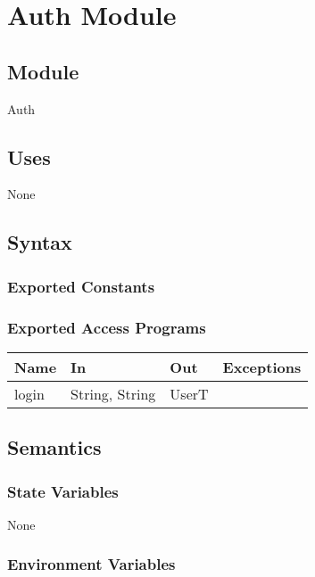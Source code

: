 \documentclass[12pt, titlepage]{article}
\begin{document}
\newpage

\section{Auth Module} \label{Auth} 

\subsection{Module}

Auth

\subsection{Uses}

None

\subsection{Syntax}

\subsubsection{Exported Constants}

\subsubsection{Exported Access Programs}

\begin{center}
\begin{tabular}{| p{4cm} | p{4cm} | p{4cm} | p{3cm} |}
\hline
\textbf{Name} & \textbf{In} & \textbf{Out} & \textbf{Exceptions} \\
\hline
login & String, String &  UserT &  \\
\hline
\end{tabular}
\end{center}

\subsection{Semantics}

\subsubsection{State Variables}

None

\subsubsection{Environment Variables}
\end{document}
